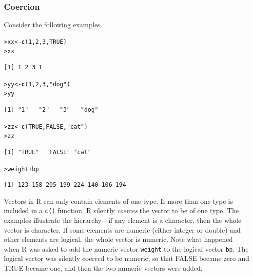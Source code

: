 \documentclass[12pt,oneside]{book}\usepackage[]{graphicx}\usepackage[]{color}
\makeatletter
\newcommand{\hlnum}[1]{\textcolor[rgb]{0.686,0.059,0.569}{#1}}%
\newcommand{\hlstr}[1]{\textcolor[rgb]{0.192,0.494,0.8}{#1}}%
\newcommand{\hlopt}[1]{\textcolor[rgb]{0,0,0}{#1}}%
\newcommand{\hlstd}[1]{\textcolor[rgb]{0.345,0.345,0.345}{#1}}%
\newcommand{\hlkwb}[1]{\textcolor[rgb]{0.69,0.353,0.396}{#1}}%
\newcommand{\hlkwd}[1]{\textcolor[rgb]{0.737,0.353,0.396}{\textbf{#1}}}%
\newenvironment{kframe}{%
 \def\at@end@of@kframe{}%
 \ifinner\ifhmode%
  \def\at@end@of@kframe{\end{minipage}}%
  \begin{minipage}{\columnwidth}%
 \fi\fi%
 \def\FrameCommand##1{\hskip\@totalleftmargin \hskip-\fboxsep
 \colorbox{shadecolor}{##1}\hskip-\fboxsep
     \hskip-\linewidth \hskip-\@totalleftmargin \hskip\columnwidth}%
 \MakeFramed {\advance\hsize-\width
   \@totalleftmargin\z@ \linewidth\hsize
   \@setminipage}}%
 {\par\unskip\endMakeFramed%
 \at@end@of@kframe}
\newenvironment{knitrout}{}{} %
\makeatother
\begin{document}
\subsubsection{Coercion}
Consider the following examples.
\begin{knitrout}
\color{fgcolor}\begin{kframe}
\begin{alltt}
\hlstd{> }\hlstd{xx} \hlkwb{<-} \hlkwd{c}\hlstd{(}\hlnum{1}\hlstd{,} \hlnum{2}\hlstd{,} \hlnum{3}\hlstd{,} \hlnum{TRUE}\hlstd{)}
\hlstd{> }\hlstd{xx}
\end{alltt}
\begin{verbatim}
[1] 1 2 3 1
\end{verbatim}
\begin{alltt}
\hlstd{> }\hlstd{yy} \hlkwb{<-} \hlkwd{c}\hlstd{(}\hlnum{1}\hlstd{,} \hlnum{2}\hlstd{,} \hlnum{3}\hlstd{,} \hlstr{"dog"}\hlstd{)}
\hlstd{> }\hlstd{yy}
\end{alltt}
\begin{verbatim}
[1] "1"   "2"   "3"   "dog"
\end{verbatim}
\begin{alltt}
\hlstd{> }\hlstd{zz} \hlkwb{<-} \hlkwd{c}\hlstd{(}\hlnum{TRUE}\hlstd{,} \hlnum{FALSE}\hlstd{,} \hlstr{"cat"}\hlstd{)}
\hlstd{> }\hlstd{zz}
\end{alltt}
\begin{verbatim}
[1] "TRUE"  "FALSE" "cat"  
\end{verbatim}
\begin{alltt}
\hlstd{> }\hlstd{weight} \hlopt{+} \hlstd{bp}
\end{alltt}
\begin{verbatim}
[1] 123 158 205 199 224 140 106 194
\end{verbatim}
\end{kframe}
\end{knitrout}
Vectors in R can only contain elements of one type. If more than one type is included in a \verb+c()+ function, R silently \emph{coerces} the vector to be of one type. The examples illustrate the hierarchy---if any element is a character, then the whole vector is character. If some elements are numeric (either integer or double) and other elements are logical, the whole vector is numeric. Note what happened when R was asked to add the numeric vector \verb+weight+ to the logical vector \verb+bp+. The logical vector was silently coerced to be numeric, so that FALSE became zero and TRUE became one, and then the two numeric vectors were added. 
\end{document}
